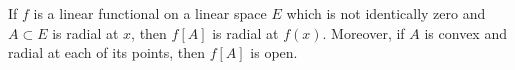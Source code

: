 If $f$ is a linear functional on a linear space $E$ which is not identically zero and $A \subset E$ is radial at $x$, then $f[A]$ is radial at $f(x)$. Moreover, if $A$ is convex and radial at each of its points, then $f[A]$ is open.
